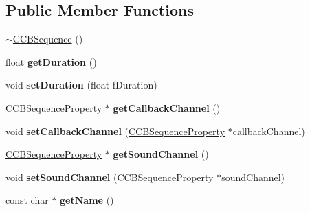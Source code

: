 \subsection*{Public Member Functions}
\begin{DoxyCompactItemize}
\item 
\hyperlink{classcocosbuilder_1_1CCBSequence_a1700cc0f94b98bf29f717e169b921c9c}{$\sim$\+C\+C\+B\+Sequence} ()
\item 
\mbox{\label{classcocosbuilder_1_1CCBSequence_af3644d228c5cafaab6ae6c399de6b42d}} 
float {\bfseries get\+Duration} ()
\item 
\mbox{\label{classcocosbuilder_1_1CCBSequence_a2593737373c9f6d2901442ad45dde545}} 
void {\bfseries set\+Duration} (float f\+Duration)
\item 
\mbox{\label{classcocosbuilder_1_1CCBSequence_a07699833f3c522db922bfd1705f9d7b4}} 
\hyperlink{classcocosbuilder_1_1CCBSequenceProperty}{C\+C\+B\+Sequence\+Property} $\ast$ {\bfseries get\+Callback\+Channel} ()
\item 
\mbox{\label{classcocosbuilder_1_1CCBSequence_ab88fcd5cb6697562785278c7b708aba1}} 
void {\bfseries set\+Callback\+Channel} (\hyperlink{classcocosbuilder_1_1CCBSequenceProperty}{C\+C\+B\+Sequence\+Property} $\ast$callback\+Channel)
\item 
\mbox{\label{classcocosbuilder_1_1CCBSequence_a8f555d758d9408ad8a9173afd68bf256}} 
\hyperlink{classcocosbuilder_1_1CCBSequenceProperty}{C\+C\+B\+Sequence\+Property} $\ast$ {\bfseries get\+Sound\+Channel} ()
\item 
\mbox{\label{classcocosbuilder_1_1CCBSequence_a6ddaa00a46f60138832ccc61ac075bbc}} 
void {\bfseries set\+Sound\+Channel} (\hyperlink{classcocosbuilder_1_1CCBSequenceProperty}{C\+C\+B\+Sequence\+Property} $\ast$sound\+Channel)
\item 
\mbox{\label{classcocosbuilder_1_1CCBSequence_afd0d599026d071af61126128041d97a7}} 
const char $\ast$ {\bfseries get\+Name} ()
\item 

\end{DoxyCompactItemize}
